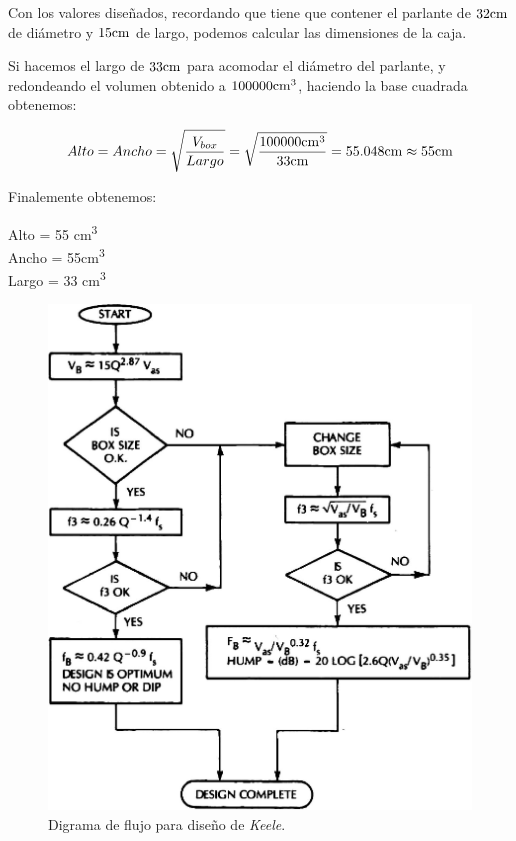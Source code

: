 Con los valores diseñados, recordando que tiene que contener el parlante de $32 \si[per-mode=symbol]{\centi\meter}$ de diámetro y $15 \si[per-mode=symbol]{\centi\meter}$ de largo, podemos calcular las dimensiones de la caja.

Si hacemos el largo de $33 \si[per-mode=symbol]{\centi\meter}$ para acomodar el diámetro del parlante, y redondeando el volumen obtenido a $100000 \si[per-mode=symbol]{\cubic\centi\meter}$, haciendo la base cuadrada obtenemos:


\begin{equation*}
Alto = Ancho = \sqrt{\frac{V_{box}}{Largo}} = \sqrt{\frac{100000 \si[per-mode=symbol]{\cubic\centi\meter}}{33 \si[per-mode=symbol]{\centi\meter}}} = 55.048 \si[per-mode=symbol]{\centi\meter} \approx 55 \si[per-mode=symbol]{\centi\meter}
\end{equation*}

Finalemente obtenemos:


\begin{mymathbox}[ams align*, title=Dimensiones de la caja (método de \textit{Keele}), colframe=EQColor!30!EQColor]
Alto = 55 \si[per-mode=symbol]{\cubic\centi\meter} \\
Ancho = 55\si[per-mode=symbol]{\cubic\centi\meter} \\
Largo = 33 \si[per-mode=symbol]{\cubic\centi\meter}
\end{mymathbox}


\vfill


\clearpage

\begin{figure}[H]
	\centering
	\includegraphics[width=1\textwidth]{./img/diag/keele.png}
	\caption{Digrama de flujo para diseño de \textit{Keele}.}
	\label{fig:flux_diagram}
\end{figure}